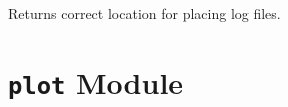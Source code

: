 \documentclass[a4paper,10pt,english]{sphinxmanual}
\begin{document}

\begin{fulllineitems}
\label{index:kafe.config.log_file}
Returns correct location for placing log files.

\end{fulllineitems}



\section{\texttt{plot} Module}
\label{index:module-kafe.plot}\label{index:plot-module}\label{index:module-plot}
\end{document}
